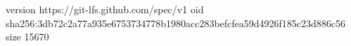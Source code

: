 version https://git-lfs.github.com/spec/v1
oid sha256:3db72c2a77a935e6753734778b1980acc283befcfea59d4926f185c23d886c56
size 15670
